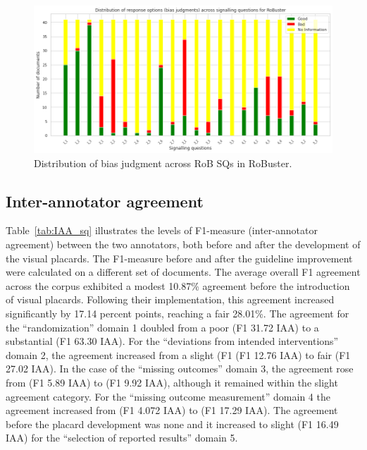 \documentclass[sn-mathphys,Numbered]{sn-jnl}%
\theoremstyle{thmstyleone}%
\theoremstyle{thmstyletwo}%
\theoremstyle{thmstylethree}%
\begin{document}
%
%
%
\begin{figure}[htb]
    \centering
    \includegraphics[width=0.90\columnwidth]{figures/bias_chart.png}
    \caption{Distribution of bias judgment across RoB SQs in RoBuster.}
    \label{fig:rob_information}
\end{figure}
%
%
%

%
%
%
\subsection{Inter-annotator agreement}
\label{result:iaa}
%
Table~\ref{tab:IAA_sq} illustrates the levels of F1-measure (inter-annotator agreement) between the two annotators, both before and after the development of the visual placards.
The F1-measure before and after the guideline improvement were calculated on a different set of documents.
The average overall F1 agreement across the corpus exhibited a modest 10.87\% agreement before the introduction of visual placards.
Following their implementation, this agreement increased significantly by 17.14 percent points, reaching a fair 28.01\%.
The agreement for the ``randomization'' domain 1 doubled from a poor (F1 31.72 IAA) to a substantial (F1 63.30 IAA).
For the ``deviations from intended interventions'' domain 2, the agreement increased from a slight (F1 (F1 12.76 IAA) to fair (F1 27.02 IAA).
In the case of the ``missing outcomes'' domain 3, the agreement rose from (F1 5.89 IAA) to (F1 9.92 IAA), although it remained within the slight agreement category. 
For the ``missing outcome measurement'' domain 4 the agreement increased from (F1 4.072 IAA) to (F1 17.29 IAA).
The agreement before the placard development was none and it increased to slight (F1 16.49 IAA) for the ``selection of reported results'' domain 5.
\end{document}
